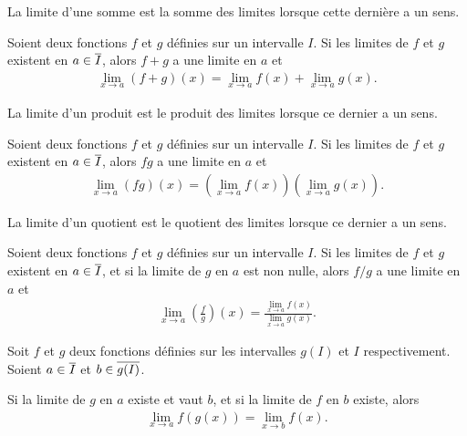 \documentclass[main.tex]{subfiles}
\begin{document}
La limite d'une somme est la somme des limites
lorsque cette dernière a un sens.

\begin{proposition}

    Soient deux fonctions $f$ et $g$ définies sur un intervalle $I$.
    Si les limites de $f$ et $g$ existent en $a \in \overline{I}$,
    alors $f + g$ a une limite en $a$ et
    \begin{align}
        \lim_{x \to a} (f + g)(x) = \lim_{x \to a} f(x) + \lim_{x \to a} g(x).
    \end{align}
\end{proposition}

La limite d'un produit est le produit des limites
lorsque ce dernier a un sens.

\begin{proposition}

    Soient deux fonctions $f$ et $g$ définies sur un intervalle $I$.
    Si les limites de $f$ et $g$ existent en $a \in \overline{I}$,
    alors $f g$ a une limite en $a$ et
    \begin{align}
        \lim_{x \to a} (fg)(x) = \left(\lim_{x \to a} f(x)\right) \left(\lim_{x \to a} g(x)\right).
    \end{align}
\end{proposition}

La limite d'un quotient est le quotient des limites
lorsque ce dernier a un sens.

\begin{proposition}

    Soient deux fonctions $f$ et $g$ définies sur un intervalle $I$.
    Si les limites de $f$ et $g$ existent en $a \in \overline{I}$,
    et si la limite de $g$ en $a$ est non nulle,
    alors $f / g$ a une limite en $a$ et
    \begin{align}
        \lim_{x \to a} \left(\frac f g\right)(x) = \frac {\lim_{x \to a} f(x)} {\lim_{x \to a} g(x)}.
    \end{align}
\end{proposition}

\begin{proposition}

    Soit $f$ et $g$ deux fonctions définies sur les intervalles $g(I)$ et $I$ respectivement.
    Soient $a \in \overline{I}$ et $b \in \overline{g(I)}$.

    Si la limite de $g$ en $a$ existe et vaut $b$,
    et si la limite de $f$ en $b$ existe,
    alors
    \begin{align}
        \lim_{x \to a} f(g(x)) = \lim_{x \to b} f(x).
    \end{align}
\end{proposition}
\end{document}
